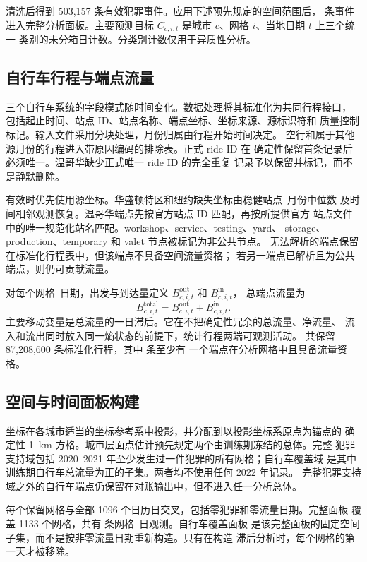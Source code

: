 清洗后得到 503,157 条有效犯罪事件。应用下述预先规定的空间范围后，
\TotalCrimeEvents{} 条事件进入完整分析面板。主要预测目标
\(C_{c,i,t}\) 是城市 \(c\)、网格 \(i\)、当地日期 \(t\) 上三个统一
类别的未分箱日计数。分类别计数仅用于异质性分析。

\subsection{自行车行程与端点流量}
\label{subsec:bicycle_data}

三个自行车系统的字段模式随时间变化。数据处理将其标准化为共同行程接口，
包括起止时间、站点 ID、站点名称、端点坐标、坐标来源、源标识符和
质量控制标记。输入文件采用分块处理，月份归属由行程开始时间决定。
空行和属于其他源月份的行程进入带原因编码的排除表。正式 ride ID 在
确定性保留首条记录后必须唯一。温哥华缺少正式唯一 ride ID 的完全重复
记录予以保留并标记，而不是静默删除。

有效时优先使用源坐标。华盛顿特区和纽约缺失坐标由稳健站点--月份中位数
及时间相邻观测恢复。温哥华端点先按官方站点 ID 匹配，再按所提供官方
站点文件中的唯一规范化站名匹配。workshop、service、testing、yard、
storage、production、temporary 和 valet 节点被标记为非公共节点。
无法解析的端点保留在标准化行程表中，但该端点不具备空间流量资格；
若另一端点已解析且为公共端点，则仍可贡献流量。

对每个网格--日期，出发与到达量定义
\(B^{\mathrm{out}}_{c,i,t}\) 和 \(B^{\mathrm{in}}_{c,i,t}\)，
总端点流量为
\[
B^{\mathrm{total}}_{c,i,t}
=B^{\mathrm{out}}_{c,i,t}+B^{\mathrm{in}}_{c,i,t}.
\]
主要移动变量是总流量的一日滞后。它在不把确定性冗余的总流量、净流量、
流入和流出同时放入同一熵状态的前提下，统计行程两端可观测活动。
共保留 87,208,600 条标准化行程，其中 \TotalBicycleTrips{} 条至少有
一个端点在分析网格中且具备流量资格。

\subsection{空间与时间面板构建}
\label{subsec:panel_construction}

坐标在各城市适当的坐标参考系中投影，并分配到以投影坐标系原点为锚点的
确定性 1~km 方格。城市层面点估计预先规定两个由训练期冻结的总体。完整
犯罪支持域包括 2020--2021 年至少发生过一件犯罪的所有网格；自行车覆盖域
是其中训练期自行车总流量为正的子集。两者均不使用任何 2022 年记录。
完整犯罪支持域之外的自行车端点仍保留在对账输出中，但不进入任一分析总体。

每个保留网格与全部 1096 个日历日交叉，包括零犯罪和零流量日期。完整面板
覆盖 1133 个网格，共有 \TotalPanelRows{} 条网格--日观测。自行车覆盖面板
是该完整面板的固定空间子集，而不是按非零流量日期重新构造。只有在构造
滞后分析时，每个网格的第一天才被移除。

